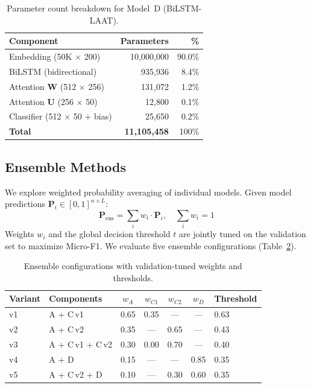 \documentclass[11pt,a4paper]{article}
\begin{document}
\begin{table}[H]
\centering
\caption{Parameter count breakdown for Model~D (BiLSTM-LAAT).}
\label{tab:params}
\small
\begin{tabular}{lrr}
\toprule
\textbf{Component} & \textbf{Parameters} & \textbf{\%} \\
\midrule
Embedding (50K $\times$ 200)     & 10,000,000 & 90.0\% \\
BiLSTM (bidirectional)           & 935,936    & 8.4\%  \\
Attention $\mathbf{W}$ (512 $\times$ 256) & 131,072 & 1.2\%  \\
Attention $\mathbf{U}$ (256 $\times$ 50)  & 12,800  & 0.1\%  \\
Classifier (512 $\times$ 50 + bias)       & 25,650  & 0.2\%  \\
\midrule
\textbf{Total}                   & \textbf{11,105,458} & 100\% \\
\bottomrule
\end{tabular}
\end{table}

\subsection{Ensemble Methods}

We explore weighted probability averaging of individual models. Given model predictions $\mathbf{P}_i \in [0,1]^{n \times L}$:
\begin{equation}
    \mathbf{P}_{\text{ens}} = \sum_i w_i \cdot \mathbf{P}_i, \quad \sum_i w_i = 1
\end{equation}
Weights $w_i$ and the global decision threshold $t$ are jointly tuned on the validation set to maximize Micro-F1. We evaluate five ensemble configurations (Table~\ref{tab:ensemble_weights}).

\begin{table}[H]
\centering
\caption{Ensemble configurations with validation-tuned weights and thresholds.}
\label{tab:ensemble_weights}
\small
\begin{tabular}{llccccl}
\toprule
\textbf{Variant} & \textbf{Components} & $w_A$ & $w_{C1}$ & $w_{C2}$ & $w_D$ & \textbf{Threshold} \\
\midrule
v1 & A + C\,v1          & 0.65 & 0.35 & ---  & ---  & 0.63 \\
v2 & A + C\,v2          & 0.35 & ---  & 0.65 & ---  & 0.43 \\
v3 & A + C\,v1 + C\,v2  & 0.30 & 0.00 & 0.70 & ---  & 0.40 \\
v4 & A + D              & 0.15 & ---  & ---  & 0.85 & 0.35 \\
v5 & A + C\,v2 + D      & 0.10 & ---  & 0.30 & 0.60 & 0.35 \\
\bottomrule
\end{tabular}
\end{table}
\end{document}
